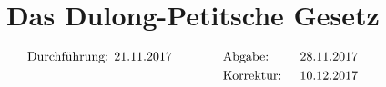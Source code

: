 

\subject{v201}
\title{Das Dulong-Petitsche Gesetz}

\date{%
\begin{align}
& \text{Durchführung: 21.11.2017} & \hspace{3em} & \text{Abgabe: } & {28.11.2017} \notag 
\\& & &\text{Korrektur: } & \text{10.12.2017} \notag
\end{align}
}



\maketitle
\thispagestyle{empty}
\tableofcontents
\newpage






\nocite{*}
\printbibliography{}


